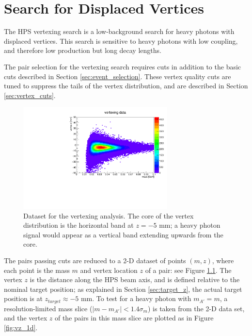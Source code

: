 \chapter{Search for Displaced Vertices}
\label{sec:vertexing}
The HPS vertexing search is a low-background search for heavy photons with displaced vertices.
This search is sensitive to heavy photons with low coupling, and therefore low production but long decay lengths.

The pair selection for the vertexing search requires cuts in addition to the basic cuts described in Section \ref{sec:event_selection}.
These vertex quality cuts are tuned to suppress the tails of the vertex distribution, and are described in Section \ref{sec:vertex_cuts}.

\begin{figure}[ht]
\begin{center}
    \includegraphics[width=0.7\textwidth,page=1,angle=-90]{vertexing/figs/golden_mres}
\end{center}
    \caption{Dataset for the vertexing analysis. The core of the vertex distribution is the horizontal band at $z=-5$ mm; a heavy photon signal would appear as a vertical band extending upwards from the core.}
    \label{fig:zvsmass}
\end{figure}

The pairs passing cuts are reduced to a 2-D dataset of points $(m,z)$, where each point is the mass $m$ and vertex location $z$ of a pair: see Figure \ref{fig:zvsmass}.
The vertex $z$ is the distance along the HPS beam axis, and is defined relative to the nominal target position; as explained in Section \ref{sec:target_z}, the actual target position is at $z_{target}\approx -5$ mm.
To test for a heavy photon with $m_{A'}=m$, a resolution-limited mass slice ($|m-m_{A'}|<1.4\sigma_m$) is taken from the 2-D data set, and the vertex $z$ of the pairs in this mass slice are plotted as in Figure \ref{fig:vz_1d}.

